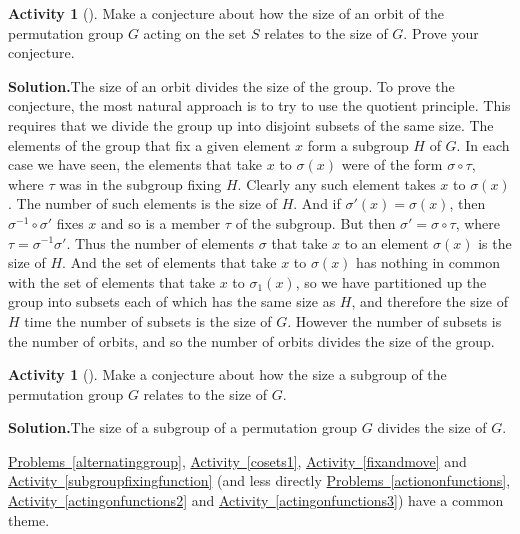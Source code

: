 \documentclass[10pt,]{book}
\theoremstyle{plain}
\theoremstyle{definition}
\newtheorem{activity}[project]{Activity}
\numberwithin{equation}{chapter}
\begin{document}
\begin{activity}[]\label{orbitsize}
Make a conjecture about how the size of an orbit of the permutation group \(G\) acting on the set \(S\) relates to the size of \(G\). Prove your conjecture.%
\par\medskip\noindent%
\textbf{Solution.}\quad The size of an orbit divides the size of the group. To prove the conjecture, the most natural approach is to try to use the quotient principle. This requires that we divide the group up into disjoint subsets of the same size. The elements of the group that fix a given element \(x\) form a subgroup \(H\) of \(G\). In each case we have seen, the elements that take \(x\) to \(\sigma(x)\) were of the form \(\sigma\circ\tau\), where \(\tau\) was in the subgroup fixing \(H\). Clearly any such element takes \(x\) to \(\sigma(x)\). The number of such elements is the size of \(H\). And if \(\sigma'(x) = \sigma(x)\), then \(\sigma^{-1}\circ \sigma'\) fixes \(x\) and so is a member \(\tau\) of the subgroup. But then \(\sigma'=\sigma\circ\tau\), where \(\tau=\sigma^{-1}\sigma'\). Thus the number of elements \(\sigma\) that take \(x\) to an element \(\sigma(x)\) is the size of \(H\). And the set of elements that take \(x\) to \(\sigma(x)\) has nothing in common with the set of elements that take \(x\) to \(\sigma_1(x)\), so we have partitioned up the group into subsets each of which has the same size as \(H\), and therefore the size of \(H\) time the number of subsets is the size of \(G\). However the number of subsets is the number of orbits, and so the number of orbits divides the size of the group.%
\end{activity}
\begin{activity}[]\label{sizeofsubgroup}
Make a conjecture about how the size a subgroup of the permutation group \(G\) relates to the size of \(G\).%
\par\medskip\noindent%
\textbf{Solution.}\quad The size of a subgroup of a permutation group \(G\) divides the size of \(G\).%
\end{activity}
\hyperref[alternatinggroup]{Problems~\ref{alternatinggroup}}, \hyperref[cosets1]{Activity~\ref{cosets1}}, \hyperref[fixandmove]{Activity~\ref{fixandmove}} and \hyperref[subgroupfixingfunction]{Activity~\ref{subgroupfixingfunction}} (and less directly \hyperref[actiononfunctions]{Problems~\ref{actiononfunctions}}, \hyperref[actingonfunctions2]{Activity~\ref{actingonfunctions2}} and \hyperref[actingonfunctions3]{Activity~\ref{actingonfunctions3}}) have a common theme.%
\par
\end{document}
